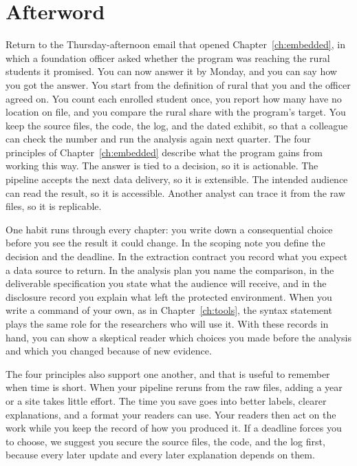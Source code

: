 
\chapter*{Afterword}
Return to the Thursday-afternoon email that opened Chapter~\ref{ch:embedded}, in which a foundation officer asked whether the program was reaching the rural students it promised. You can now answer it by Monday, and you can say how you got the answer. You start from the definition of rural that you and the officer agreed on. You count each enrolled student once, you report how many have no location on file, and you compare the rural share with the program's target. You keep the source files, the code, the log, and the dated exhibit, so that a colleague can check the number and run the analysis again next quarter. The four principles of Chapter~\ref{ch:embedded} describe what the program gains from working this way. The answer is tied to a decision, so it is actionable. The pipeline accepts the next data delivery, so it is extensible. The intended audience can read the result, so it is accessible. Another analyst can trace it from the raw files, so it is replicable.

One habit runs through every chapter: you write down a consequential choice before you see the result it could change. In the scoping note you define the decision and the deadline. In the extraction contract you record what you expect a data source to return. In the analysis plan you name the comparison, in the deliverable specification you state what the audience will receive, and in the disclosure record you explain what left the protected environment. When you write a command of your own, as in Chapter~\ref{ch:tools}, the syntax statement plays the same role for the researchers who will use it. With these records in hand, you can show a skeptical reader which choices you made before the analysis and which you changed because of new evidence.

The four principles also support one another, and that is useful to remember when time is short. When your pipeline reruns from the raw files, adding a year or a site takes little effort. The time you save goes into better labels, clearer explanations, and a format your readers can use. Your readers then act on the work while you keep the record of how you produced it. If a deadline forces you to choose, we suggest you secure the source files, the code, and the log first, because every later update and every later explanation depends on them.

